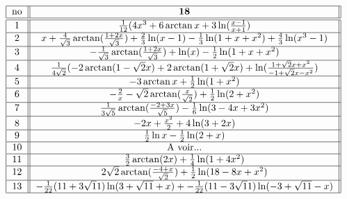 
\[ \begin{tabular}{| c || c ||  }
\hline       no &         ${\bf 18}                                          $                                                                                                               \\    \hline \hline
             $1$   & $\frac{1}{12}(4x^3+6\arctan x +3\ln(\frac{x-1}{x+1})      $            \\ \hline 
            $2$   &  $ x+\frac{4}{\sqrt 3}\arctan(\frac{1+2x}{\sqrt 3})+ \frac{2}{3}\ln(x-1)- \frac{1}{3}\ln(1+x+x^2) +\frac{4}{3}\ln(x^3-1)$                 \\ \hline

           $3$   &      $  - \frac{1}{\sqrt 3}\arctan(\frac{1+2x}{\sqrt 3})     +\ln(x)- \frac{1}{2}\ln(1+x+x^2)       $ 						\\ \hline 
           $4$   &      $   \frac{1}{4\sqrt 2}(-2\arctan(1-\sqrt2x)+2\arctan(1+\sqrt2x)+\ln(\frac{1+\sqrt2x+x^2}{-1+\sqrt2x-x^2})             $                                                 				\\ \hline 
              $5$   &      $   -3\arctan x+\frac{1}{2}\ln(1+x^2)$   				 \\ \hline
               $6$  &      $-\frac{2}{x}-\sqrt2\arctan(\frac{x}{\sqrt2})+\frac{1}{2}\ln(2+x^2)$                       \\ \hline
              $7$ &      $\frac{1}{3\sqrt5}\arctan(\frac{-2+3x}{\sqrt5}) -\frac{1}{6}\ln(3-4x+3x^2) $                        \\ \hline
               $8$ &     $-2x+\frac{x^2}{2}+4\ln(3+2x)$  			                                                                                \\ \hline
              $9$     &     $\frac{1}{2}\ln x -\frac{1}{2}\ln(2+x)$  			                                                                       \\ \hline
               $10$  &  A voir...     			                                                               \\ \hline
              $11$  &  $\frac{3}{2}\arctan(2x)+\frac{1}{4}\ln(1+4x^2)$			                                                               \\ \hline   
               $12$ &  $2\sqrt2\arctan(\frac{-4+x}{\sqrt2})+\frac{1}{2}\ln(18-8x+x^2)$			                                                               \\ \hline   
              $13$  &  $-\frac{1}{22}(11+3\sqrt11)\ln(3+\sqrt{11}+x)+-\frac{1}{22}(11-3\sqrt11)\ln(-3+\sqrt{11}-x)$			                                                               \\ \hline   

\end{tabular}\]
